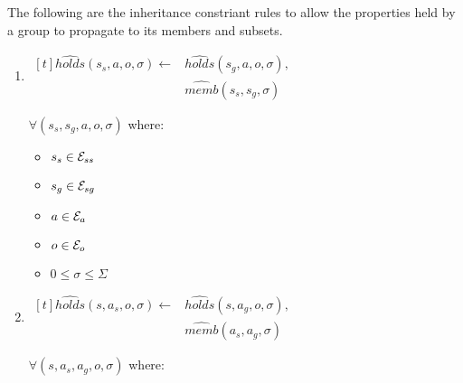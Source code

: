 \documentclass[10pt, twocolumn]{article}
\begin{document}
            The following are the inheritance constriant rules to allow the
            properties held by a group to propagate to its members and
            subsets.

            \begin{enumerate}
              \item
                \begin{math}
                  \begin{aligned}[t]
                    \hat{holds}(s_{s}, a, o, \sigma) \leftarrow &
                    \hat{holds}(s_{g}, a, o, \sigma), \\
                    & \hat{memb}(s_{s}, s_{g}, \sigma)
                  \end{aligned}
                \end{math}

                $\forall (s_{s}, s_{g}, a, o, \sigma)$ where:

                \begin{itemize}
                  \item
                    $s_{s} \in {\cal E}_{ss}$
                  \item
                    $s_{g} \in {\cal E}_{sg}$
                  \item
                    $a \in {\cal E}_{a}$
                  \item
                    $o \in {\cal E}_{o}$
                  \item
                    $0 \leq \sigma \leq \Sigma$
                \end{itemize}
              \item
                \begin{math}
                  \begin{aligned}[t]
                    \hat{holds}(s, a_{s}, o, \sigma) \leftarrow &
                    \hat{holds}(s, a_{g}, o, \sigma), \\
                    & \hat{memb}(a_{s}, a_{g}, \sigma)
                  \end{aligned}
                \end{math}

                $\forall (s, a_{s}, a_{g}, o, \sigma)$ where:


\end{enumerate}
\end{document}
